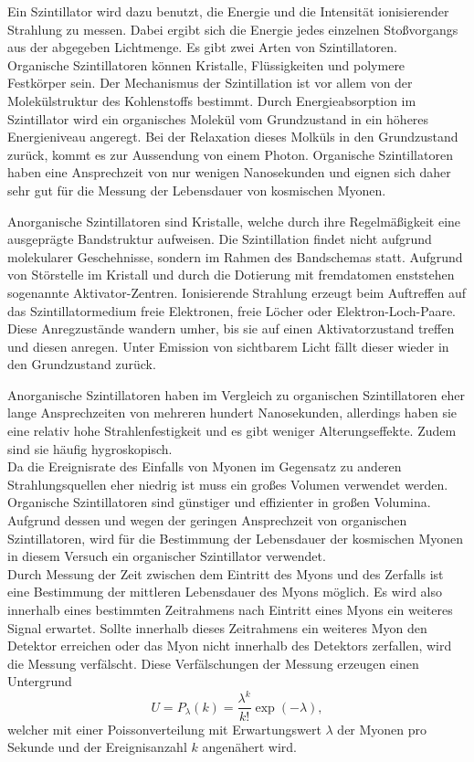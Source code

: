 Ein Szintillator wird dazu benutzt, die Energie und die Intensität ionisierender Strahlung zu messen. Dabei ergibt sich die Energie 
jedes einzelnen Stoßvorgangs aus der abgegeben Lichtmenge.
Es gibt zwei Arten von Szintillatoren.\\


Organische Szintillatoren können Kristalle, Flüssigkeiten und polymere Festkörper sein. 
Der Mechanismus der Szintillation ist vor allem von der Molekülstruktur des Kohlenstoffs bestimmt.
Durch Energieabsorption im Szintillator wird ein organisches Molekül vom Grundzustand in ein höheres Energieniveau angeregt.
Bei der Relaxation dieses Molküls in den Grundzustand zurück, kommt es zur Aussendung von einem Photon.
Organische Szintillatoren haben eine Ansprechzeit von nur wenigen Nanosekunden und eignen sich daher sehr gut für die Messung der Lebensdauer
von kosmischen Myonen.

Anorganische Szintillatoren sind Kristalle, welche durch ihre Regelmäßigkeit eine ausgeprägte Bandstruktur aufweisen.
Die Szintillation findet nicht aufgrund molekularer Geschehnisse, sondern im Rahmen des Bandschemas statt.
Aufgrund von Störstelle im Kristall und durch die Dotierung mit fremdatomen enststehen sogenannte Aktivator-Zentren.
Ionisierende Strahlung erzeugt beim Auftreffen auf das Szintillatormedium freie 
Elektronen, freie Löcher oder Elektron-Loch-Paare. Diese Anregzustände wandern umher, bis sie auf einen Aktivatorzustand treffen und diesen
anregen. Unter Emission von sichtbarem Licht fällt dieser wieder in den Grundzustand zurück.

Anorganische Szintillatoren haben im Vergleich zu organischen Szintillatoren eher lange Ansprechzeiten von mehreren hundert Nanosekunden,
allerdings haben sie eine relativ hohe Strahlenfestigkeit und es gibt weniger Alterungseffekte. Zudem sind sie häufig hygroskopisch.\\

Da die Ereignisrate des Einfalls von Myonen im Gegensatz zu anderen Strahlungsquellen eher niedrig ist muss ein großes Volumen verwendet werden.
Organische Szintillatoren sind günstiger und effizienter in großen Volumina.
Aufgrund dessen und wegen der geringen Ansprechzeit von organischen Szintillatoren, wird für die Bestimmung der Lebensdauer der kosmischen Myonen
in diesem Versuch ein organischer Szintillator verwendet.\\ 


Durch Messung der Zeit zwischen dem Eintritt des Myons und des
Zerfalls ist eine Bestimmung der mittleren Lebensdauer des Myons möglich.
Es wird also innerhalb eines bestimmten Zeitrahmens nach Eintritt eines Myons ein weiteres Signal
erwartet.
Sollte innerhalb dieses Zeitrahmens ein weiteres Myon den Detektor erreichen oder das
Myon nicht innerhalb des Detektors zerfallen, wird die Messung verfälscht.
Diese Verfälschungen der Messung erzeugen einen Untergrund
\begin{equation}
  U = P_{\lambda} (k) = \frac{\lambda^{k}}{k!} \exp{(-\lambda)},
  \label{eqn:Untergrundrate}
\end{equation}
welcher mit einer Poissonverteilung mit Erwartungswert $\lambda$ der Myonen pro Sekunde und der Ereignisanzahl $k$ angenähert wird.


